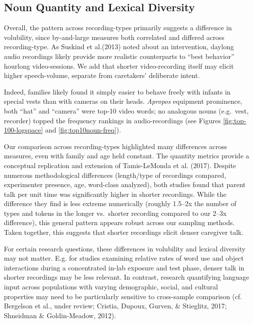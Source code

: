 \documentclass[man]{apa6}
\theoremstyle{definition}
\theoremstyle{definition}
\theoremstyle{definition}
\theoremstyle{remark}
\begin{document}
\subsection{Noun Quantity and Lexical
Diversity}\label{noun-quantity-and-lexical-diversity}

Overall, the pattern across recording-types primarily suggests a
difference in volubility, since by-and-large measures both correlated
and differed across recording-type. As Suskind et al.(2013) noted about
an intervention, daylong audio recordings likely provide more realistic
counterparts to \enquote{best behavior} hourlong video-sessions. We add
that shorter video-recording itself may elicit higher speech-volume,
separate from caretakers' deliberate intent.

Indeed, families likely found it simply easier to behave freely with
infants in special vests than with cameras on their heads.
\emph{Apropos} equipment prominence, both \enquote{hat} and
\enquote{camera} were top-10 video words; no analogous nouns (e.g.~vest,
recorder) topped the frequency rankings in audio-recordings (see Figures
\ref{fig:top-100-logspace} and \ref{fig:top10noun-freq}).

Our comparison across recording-types highlighted many differences
across measures, even with family and age held constant. The quantity
metrics provide a conceptual replication and extension of Tamis-LeMonda
et al. (2017). Despite numerous methodological differences (length/type
of recordings compared, experimenter presence, age, word-class
analyzed), both studies found that parent talk per unit time was
significantly higher in shorter recordings. While the difference they
find is less extreme numerically (roughly 1.5--2x the number of types
and tokens in the longer vs.~shorter recording compared to our 2--3x
difference), this general pattern appears robust across our sampling
methods. Taken together, this suggests that shorter recordings elicit
denser caregiver talk.

For certain research questions, these differences in volubility and
lexical diversity may not matter. E.g. for studies examining relative
rates of word use and object interactions during a concentrated in-lab
exposure and test phase, denser talk in shorter recordings may be less
relevant. In contrast, research quantifying language input across
populations with varying demographic, social, and cultural properties
may need to be particularly sensitive to cross-sample comparison (cf.
Bergelson et al., under review; Cristia, Dupoux, Gurven, \& Stieglitz,
2017; Shneidman \& Goldin-Meadow, 2012).
\end{document}
